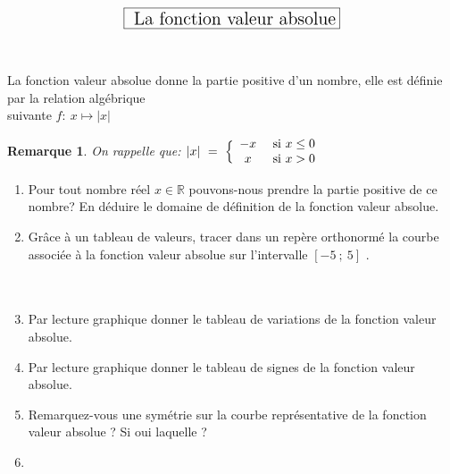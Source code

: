 \documentclass[a4paper,10pt]{article}
\newtheorem{defi}{Définition}
\newtheorem{rmq}{Remarque}
\newcommand{\R}{\mathbb{R}}
\begin{document}
	\newpage
	 $$\fbox{\text{\Large{ La fonction valeur absolue}}}$$
	 \hfil\\\hfil\\
	\noindent La fonction valeur absolue donne la partie positive d'un nombre, elle est définie par la relation algébrique \\suivante \quad
	$f:~x \longmapsto |x|$\\
	\begin{rmq}
		On rappelle que: $ |x| \ = \ \Big\{\normalsize\begin{array}{cl}
			-x &\ \text{si} \ x \leq 0\\
			x &\ \text{si} \ x > 0
		\end{array} $
	\end{rmq}
	\begin{enumerate}
		\item Pour tout nombre réel $x\in\R$ pouvons-nous prendre la partie positive de ce nombre? En déduire le domaine de définition de la fonction valeur absolue. \\
		\item Grâce à un tableau de valeurs, tracer dans un repère orthonormé la courbe associée à la fonction valeur absolue sur l'intervalle $[-5~;~5]$ .\\ \hfil\\
		\noindent{}\hfil\\
		\item Par lecture graphique donner le tableau de variations de la fonction valeur absolue.\\   
		\item Par lecture graphique donner le tableau de signes de la fonction valeur absolue.\\
		\item Remarquez-vous une symétrie sur la courbe représentative de la fonction valeur absolue ? Si oui laquelle ?\\
		\item
\end{enumerate}
\end{document}
